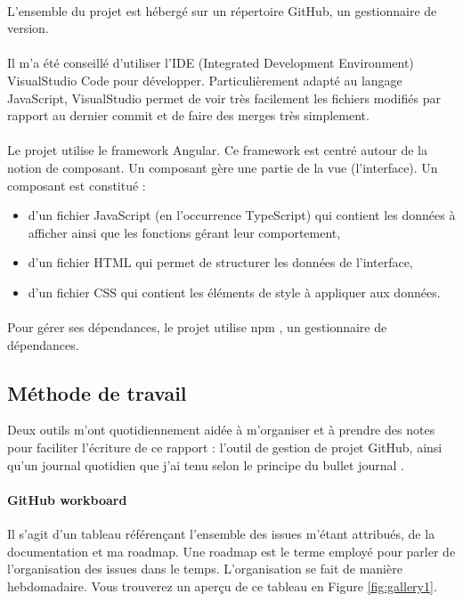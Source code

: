 \documentclass[12pt]{article}
\begin{document}
\paragraph{}
L'ensemble du projet est hébergé sur un répertoire GitHub, un gestionnaire de version.

\paragraph{}
Il m'a été conseillé d'utiliser l'IDE (Integrated Development Environment) VisualStudio Code pour développer. Particulièrement adapté au langage JavaScript, VisualStudio permet de voir très facilement les fichiers modifiés par rapport au dernier commit et de faire des merges très simplement.

\paragraph{}
Le projet utilise le framework Angular. Ce framework est centré autour de la notion de composant. Un composant gère une partie de la vue (l'interface). Un composant est constitué :
\begin{itemize}
    \item d'un fichier JavaScript (en l'occurrence TypeScript) qui contient les données à afficher ainsi que les fonctions gérant leur comportement,
    \item d'un fichier HTML qui permet de structurer les données de l'interface,
    \item d'un fichier CSS qui contient les éléments de style à appliquer aux données.
\end{itemize}

\paragraph{}
Pour gérer ses dépendances, le projet utilise npm \cite{npm}, un gestionnaire de dépendances.\\

\subsection{Méthode de travail}
Deux outils m'ont quotidiennement aidée à m'organiser et à prendre des notes pour faciliter l'écriture de ce rapport : l'outil de gestion de projet GitHub, ainsi qu'un journal quotidien que j'ai tenu selon le principe du bullet journal \cite{bullet}.

\paragraph{GitHub workboard}
Il s'agit d'un tableau référençant l'ensemble des issues m'étant attribués, de la documentation et ma roadmap. Une roadmap est le terme employé pour parler de l'organisation des issues dans le temps. L'organisation se fait de manière hebdomadaire. Vous trouverez un aperçu de ce tableau en Figure \ref{fig:gallery1}.
\end{document}
